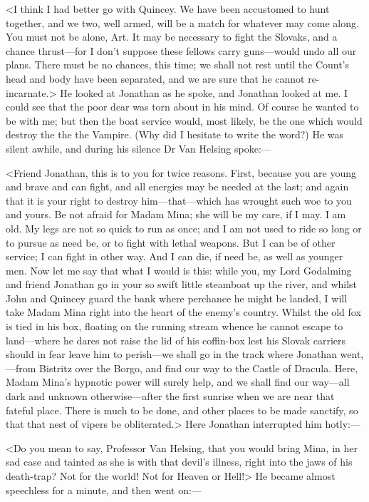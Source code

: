 <I think I had better go with Quincey. We have been accustomed to hunt together, and we two, well armed, will be a match for whatever may come along. You must not be alone, Art. It may be necessary to fight the Slovaks, and a chance thrust—for I don't suppose these fellows carry guns—would undo all our plans. There must be no chances, this time; we shall not rest until the Count's head and body have been separated, and we are sure that he cannot re-incarnate.> He looked at Jonathan as he spoke, and Jonathan looked at me. I could see that the poor dear was torn about in his mind. Of course he wanted to be with me; but then the boat service would, most likely, be the one which would destroy the \textellipsis the \textellipsis the \textellipsis Vampire. (Why did I hesitate to write the word?) He was silent awhile, and during his silence Dr Van Helsing spoke:—

<Friend Jonathan, this is to you for twice reasons. First, because you are young and brave and can fight, and all energies may be needed at the last; and again that it is your right to destroy him—that—which has wrought such woe to you and yours. Be not afraid for Madam Mina; she will be my care, if I may. I am old. My legs are not so quick to run as once; and I am not used to ride so long or to pursue as need be, or to fight with lethal weapons. But I can be of other service; I can fight in other way. And I can die, if need be, as well as younger men. Now let me say that what I would is this: while you, my Lord Godalming and friend Jonathan go in your so swift little steamboat up the river, and whilst John and Quincey guard the bank where perchance he might be landed, I will take Madam Mina right into the heart of the enemy's country. Whilst the old fox is tied in his box, floating on the running stream whence he cannot escape to land—where he dares not raise the lid of his coffin-box lest his Slovak carriers should in fear leave him to perish—we shall go in the track where Jonathan went,—from Bistritz over the Borgo, and find our way to the Castle of Dracula. Here, Madam Mina's hypnotic power will surely help, and we shall find our way—all dark and unknown otherwise—after the first sunrise when we are near that fateful place. There is much to be done, and other places to be made sanctify, so that that nest of vipers be obliterated.> Here Jonathan interrupted him hotly:—

<Do you mean to say, Professor Van Helsing, that you would bring Mina, in her sad case and tainted as she is with that devil's illness, right into the jaws of his death-trap? Not for the world! Not for Heaven or Hell!> He became almost speechless for a minute, and then went on:—

